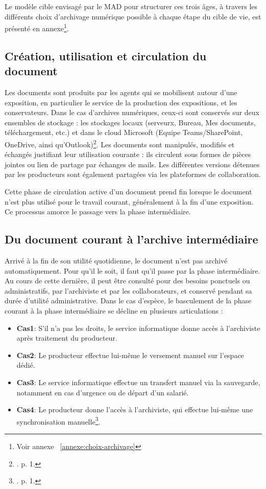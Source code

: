 Le modèle cible envisagé par le MAD pour structurer ces trois âges, à travers les différents choix d'archivage numérique possible à chaque étape du cible de vie, est présenté en annexe\footnote{Voir annexe ~\ref{annexe:choix-archivage}}. 


\subsection{Création, utilisation et circulation du document}


Les documents sont produits par les agents qui se mobilisent autour d'une exposition, en particulier le service de la production des expositions, et les conservateurs. Dans le cas d'archives numériques, ceux-ci sont conservés sur deux ensembles de stockage : les stockages locaux (serveurx, Bureau, Mes documents, téléchargement, etc.) et dans le cloud Microsoft (Equipe Teams/SharePoint, OneDrive, ainsi qu'Outlook)\footnote{\cite{dion-choix-archivage-2026}. p. 1.}. Les documents sont manipulés, modifiés et échangés justifiant leur utilisation courante : ils circulent sous formes de pièces jointes ou lien de partage par échanges de mails. Les différentes versions détenues par les producteurs sont également partagées via les plateformes de collaboration. 

Cette phase de circulation active d'un document prend fin lorsque le document n'est plus utilisé pour le travail courant, généralement à la fin d'une exposition. Ce processus amorce le passage vers la phase intermédiaire.



\subsection*{Du document courant à l’archive intermédiaire}


Arrivé à la fin de son utilité quotidienne, le document n'est pas archivé automatiquement. Pour qu'il le soit, il faut qu'il passe par la phase intermédiaire. Au cours de cette dernière, il peut être consulté pour des besoins ponctuels ou administratifs, par l'archiviste et par les collaborateurs, et conservé pendant sa durée d'utilité administrative. Dans le cas d'espèce, le basculement de la phase courant à la phase intermédiaire se décline en plusieurs articulations : 

\begin{itemize}[label=---]
	\item \textbf{Cas1}: S'il n'a pas les droits, le service informatique donne accès à l'archiviste après traitement du producteur.
	\item \textbf{Cas2}: Le producteur effectue lui-même le versement manuel sur l'espace dédié.
	\item \textbf{Cas3}: Le service informatique effectue un transfert manuel via la sauvegarde, notamment en cas d'urgence ou de départ d'un salarié.
	\item \textbf{Cas4}: Le producteur donne l'accès à l'archiviste, qui effectue lui-même une synchronisation manuelle\footnote{\cite{dion-choix-archivage-2026}. p. 1.}.

\end{itemize}

